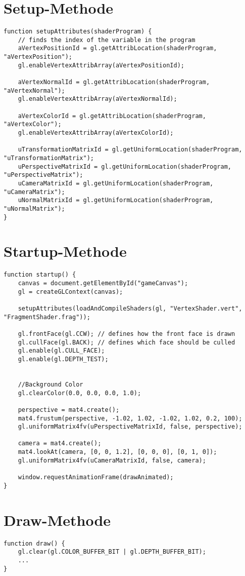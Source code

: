 \section{Setup-Methode}
\begin{lstlisting}
function setupAttributes(shaderProgram) {
    // finds the index of the variable in the program
    aVertexPositionId = gl.getAttribLocation(shaderProgram, "aVertexPosition");
    gl.enableVertexAttribArray(aVertexPositionId);

    aVertexNormalId = gl.getAttribLocation(shaderProgram, "aVertexNormal");
    gl.enableVertexAttribArray(aVertexNormalId);

    aVertexColorId = gl.getAttribLocation(shaderProgram, "aVertexColor");
    gl.enableVertexAttribArray(aVertexColorId);

    uTransformationMatrixId = gl.getUniformLocation(shaderProgram, "uTransformationMatrix");
    uPerspectiveMatrixId = gl.getUniformLocation(shaderProgram, "uPerspectiveMatrix");
    uCameraMatrixId = gl.getUniformLocation(shaderProgram, "uCameraMatrix");
    uNormalMatrixId = gl.getUniformLocation(shaderProgram, "uNormalMatrix");
}
\end{lstlisting}


\section{Startup-Methode}
\begin{lstlisting}
function startup() {
    canvas = document.getElementById("gameCanvas");
    gl = createGLContext(canvas);

    setupAttributes(loadAndCompileShaders(gl, "VertexShader.vert", "FragmentShader.frag"));

    gl.frontFace(gl.CCW); // defines how the front face is drawn
    gl.cullFace(gl.BACK); // defines which face should be culled
    gl.enable(gl.CULL_FACE);
    gl.enable(gl.DEPTH_TEST);


    //Background Color
    gl.clearColor(0.0, 0.0, 0.0, 1.0);

    perspective = mat4.create();
    mat4.frustum(perspective, -1.02, 1.02, -1.02, 1.02, 0.2, 100);
    gl.uniformMatrix4fv(uPerspectiveMatrixId, false, perspective);

    camera = mat4.create();
    mat4.lookAt(camera, [0, 0, 1.2], [0, 0, 0], [0, 1, 0]);
    gl.uniformMatrix4fv(uCameraMatrixId, false, camera);
    
	window.requestAnimationFrame(drawAnimated);
}
\end{lstlisting}


\section{Draw-Methode}
\begin{lstlisting}
function draw() {
    gl.clear(gl.COLOR_BUFFER_BIT | gl.DEPTH_BUFFER_BIT);
    ...
}
\end{lstlisting}